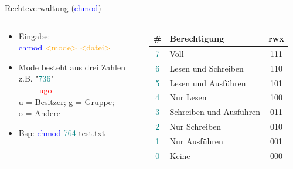 \documentclass[t, xcolor=dvipsnames]{beamer}
\begin{document}
\begin{frame}{Rechteverwaltung (\textcolor{blue}{chmod})}

    \begin{columns}
	\begin{column}{0.5\textwidth}
	
	\begin{itemize}
        \item Eingabe:\\ \textcolor{blue}{chmod} \textcolor{orange}{<mode> <datei>}
        \item Mode besteht aus drei Zahlen\\z.B. "\textcolor{teal}{736}"\\ \, \, \, \, \ \textcolor{red}{ugo}\\ u = Besitzer; g = Gruppe;\\ o = Andere
        \item Bsp: \textcolor{blue}{chmod} \textcolor{teal}{764} test.txt
    \end{itemize}
	
	\end{column}
	\begin{column}{0.5\textwidth}
	
	\begin{table}[]
        \begin{tabular}{|c|l|c|}
            \hline
            \textbf{\#} & \textbf{Berechtigung} & \textbf{rwx}\\
            \hline
            \textcolor{teal}{7} & Voll & 111 \\
            \hline
            \textcolor{teal}{6} & Lesen und Schreiben & 110 \\
            \hline
            \textcolor{teal}{5} & Lesen und Ausführen & 101 \\
            \hline
            \textcolor{teal}{4} & Nur Lesen & 100 \\
            \hline
            \textcolor{teal}{3} & Schreiben und Ausführen & 011 \\
            \hline
            \textcolor{teal}{2} & Nur Schreiben & 010 \\
            \hline
            \textcolor{teal}{1} & Nur Ausführen & 001 \\
            \hline
            \textcolor{teal}{0} & Keine & 000 \\
            \hline
        \end{tabular}
    \end{table}
    	
	\end{column}
\end{columns}
    
\end{frame}
\end{document}
